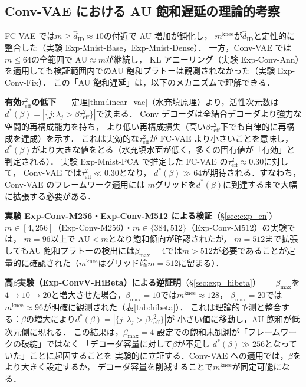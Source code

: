 \documentclass[11pt,a4paper]{jsarticle}
\newcommand{\mknee}{m^{\mathrm{knee}}}
\begin{document}
\subsection{Conv-VAE における AU 飽和遅延の理論的考察}\label{sec:disc_convvae}

FC-VAE では$m \geq \hat{d}_\mathrm{ID} \approx 10$の付近で AU 増加が鈍化し，
$\mknee$が$\hat{d}_\mathrm{ID}$と定性的に整合した（実験 Exp-Mnist-Base，Exp-Mnist-Dense）．
一方，Conv-VAE では$m \leq 64$の全範囲で AU$\approx m$が継続し，
KL アニーリング（実験 Exp-Conv-Ann）を適用しても検証範囲内でのAU 飽和プラトーは観測されなかった（実験 Exp-Conv-Fix）．
この「AU 飽和遅延」は，以下のメカニズムで理解できる．

\textbf{有効$\tau^2_\mathrm{eff}$の低下}~~~
定理\ref{thm:linear_vae}（水充填原理）より，活性次元数は
$d^*(\beta) = |\{j : \lambda_j > \beta\tau^2_\mathrm{eff}\}|$で決まる．
Conv デコーダは全結合デコーダより強力な空間的再構成能力を持ち，
より低い再構成損失（高い$\beta\tau^2_\mathrm{eff}$下でも自律的に再構成を達成）を示す．
これは実効的な$\tau^2_\mathrm{eff}$が FC-VAE より小さいことを意味し，
$d^*(\beta)$がより大きな値をとる（水充填水面が低く，多くの固有値が「有効」と判定される）．
実験 Exp-Mnist-PCA で推定した FC-VAE の$\tau^2_\mathrm{eff} \approx 0.30$に対して，
Conv-VAE では$\tau^2_\mathrm{eff} \ll 0.30$となり，
$d^*(\beta) \gg 64$が期待される．すなわち，Conv-VAE のフレームワーク適用には
$m$グリッドを$d^*(\beta)$に到達するまで大幅に拡張する必要がある．

\textbf{実験 Exp-Conv-M256・Exp-Conv-M512 による検証}（§\ref{sec:exp_en}）~~~
$m \in [4,256]$（Exp-Conv-M256）・$m \in \{384,512\}$（Exp-Conv-M512）の実験では，
$m = 96$以上で AU$<m$となり飽和傾向が確認されたが，
$m=512$まで拡張してもAU 飽和プラトーの検出には$\beta_{\max}=4$では$m>512$が必要であることが定量的に確認された（$\mknee$はグリッド端$m=512$に留まる）．

\textbf{高$\beta$実験（Exp-ConvV-HiBeta）による逆証明}（§\ref{sec:exp_hibeta}）~~~
$\beta_{\max}$を$4\to10\to20$と増大させた場合，$\beta_{\max}=10$では$\mknee \approx 128$，
$\beta_{\max}=20$では$\mknee \approx 96$が明確に観測された（表\ref{tab:hibeta}）．
これは理論的予測と整合する：$\beta$の増大により$d^*(\beta) = |\{j: \lambda_j > \beta\tau^2_\mathrm{eff}\}|$が
小さい値に移動し，AU 飽和が低次元側に現れる．
この結果は，$\beta_{\max}=4$ 設定での飽和未観測が「フレームワークの破綻」ではなく
「デコーダ容量に対して$\beta$が不足し $d^*(\beta) \gg 256$となっていた」ことに起因することを
実験的に立証する．Conv-VAE への適用では，$\beta$をより大きく設定するか，
デコーダ容量を削減することで$\mknee$が同定可能になる．
\end{document}
